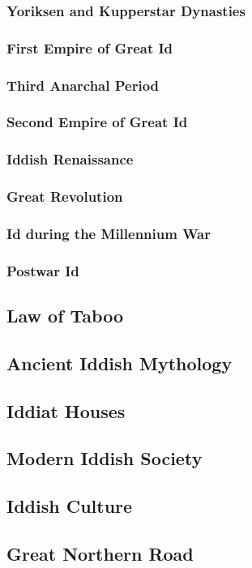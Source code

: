 		\subsubsection{Yoriksen and Kupperstar Dynasties}\par
		\subsubsection{First Empire of Great Id}\par
		\subsubsection{Third Anarchal Period}\par
		\subsubsection{Second Empire of Great Id}\par
		\subsubsection{Iddish Renaissance}\par
		\subsubsection{Great Revolution}\par
		\subsubsection{Id during the Millennium War}\par
		\subsubsection{Postwar Id}\par
	\subsection{Law of Taboo}
	\subsection{Ancient Iddish Mythology}
	\subsection{Iddiat Houses}
	\subsection{Modern Iddish Society}
	\subsection{Iddish Culture}
	\subsection{Great Northern Road}
